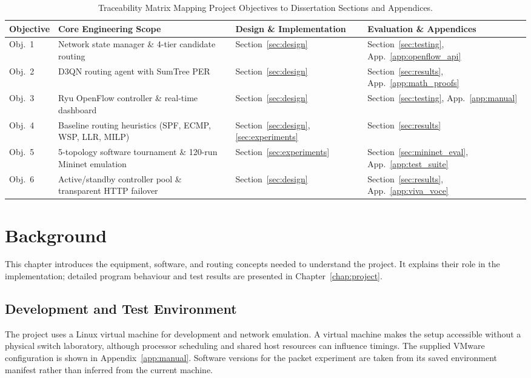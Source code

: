 \documentclass[12pt,a4paper,oneside]{report}
\begin{document}
\begin{table}[htbp]
\centering
\small
\caption{Traceability Matrix Mapping Project Objectives to Dissertation Sections and Appendices.}
\label{tab:objective_mapping}
\begin{tabularx}{\linewidth}{lXp{3.8cm}p{3.2cm}}
\toprule
\textbf{Objective} & \textbf{Core Engineering Scope} & \textbf{Design \& Implementation} & \textbf{Evaluation \& Appendices} \\
\midrule
Obj.~1 & Network state manager \& 4-tier candidate routing & Section~\ref{sec:design} & Section~\ref{sec:testing}, App.~\ref{app:openflow_api} \\
Obj.~2 & D3QN routing agent with SumTree PER & Section~\ref{sec:design} & Section~\ref{sec:results}, App.~\ref{app:math_proofs} \\
Obj.~3 & Ryu OpenFlow controller \& real-time dashboard & Section~\ref{sec:design} & Section~\ref{sec:testing}, App.~\ref{app:manual} \\
Obj.~4 & Baseline routing heuristics (SPF, ECMP, WSP, LLR, MILP) & Section~\ref{sec:design}, \ref{sec:experiments} & Section~\ref{sec:results} \\
Obj.~5 & 5-topology software tournament \& 120-run Mininet emulation & Section~\ref{sec:experiments} & Section~\ref{sec:mininet_eval}, App.~\ref{app:test_suite} \\
Obj.~6 & Active/standby controller pool \& transparent HTTP failover & Section~\ref{sec:design} & Section~\ref{sec:results}, App.~\ref{app:viva_voce} \\
\bottomrule
\end{tabularx}
\end{table}


\chapter{Background}
\label{chap:background}

This chapter introduces the equipment, software, and routing concepts needed to understand the project. It explains their role in the implementation; detailed program behaviour and test results are presented in Chapter~\ref{chap:project}.

\section{Development and Test Environment}
The project uses a Linux virtual machine for development and network emulation. A virtual machine makes the setup accessible without a physical switch laboratory, although processor scheduling and shared host resources can influence timings. The supplied VMware configuration is shown in Appendix~\ref{app:manual}. Software versions for the packet experiment are taken from its saved environment manifest rather than inferred from the current machine.
\end{document}
